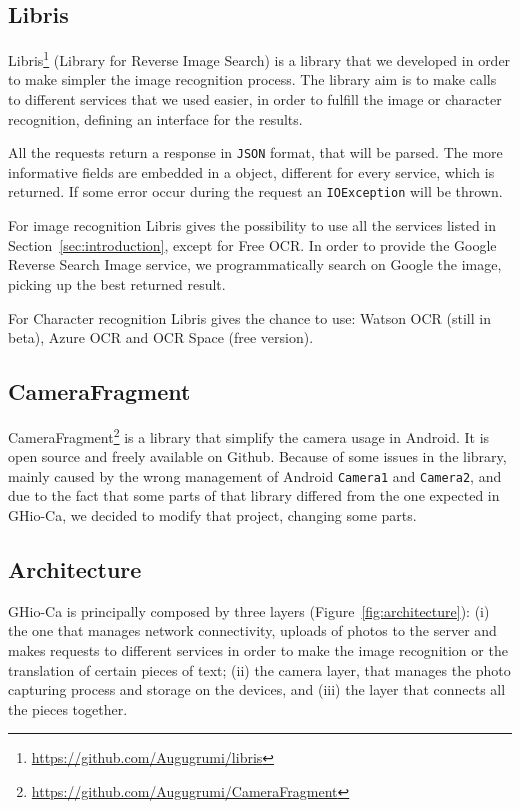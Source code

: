 \subsection{Libris}
Libris\footnote{\url{https://github.com/Augugrumi/libris}} (Library for Reverse
Image Search) is a library that we developed in order to make 
simpler the image recognition process. The library aim is to make calls 
to different services that we used easier, in order to fulfill the image or 
character recognition, defining an interface for the results.

All the requests return a response in \texttt{JSON} format, that will be parsed.
The more informative fields are embedded in a object, different for every
service, which is returned. If some error occur during the request an
\texttt{IOException} will be thrown.

For image recognition Libris gives the possibility to use all the services
listed in Section~\ref{sec:introduction}, except for Free OCR. In order to
provide the Google Reverse Search Image service, we programmatically search on
Google the image, picking up the best returned result.

For Character recognition Libris gives the chance to use: Watson OCR (still in
beta), Azure OCR and OCR Space (free version).

\subsection{CameraFragment}
CameraFragment\footnote{\url{https://github.com/Augugrumi/CameraFragment}} is a
library that simplify the camera usage in Android. It is
open source and freely available on Github. Because of some issues in the
library, mainly caused by the wrong management of Android \texttt{Camera1} and
\texttt{Camera2}, and due to the fact that some parts of that library differed
from the one expected in GHio-Ca, we decided to modify that project, changing
some parts.

\subsection{Architecture}
GHio-Ca is principally composed by three layers (Figure~\ref{fig:architecture}):
(i) the one that manages network connectivity, uploads of photos to the server
and makes requests to different services in order to make the image recognition
or the translation of certain pieces of text; (ii) the camera layer, that
manages the photo capturing process and storage on the devices, and (iii) the
layer that
connects all the pieces together.


